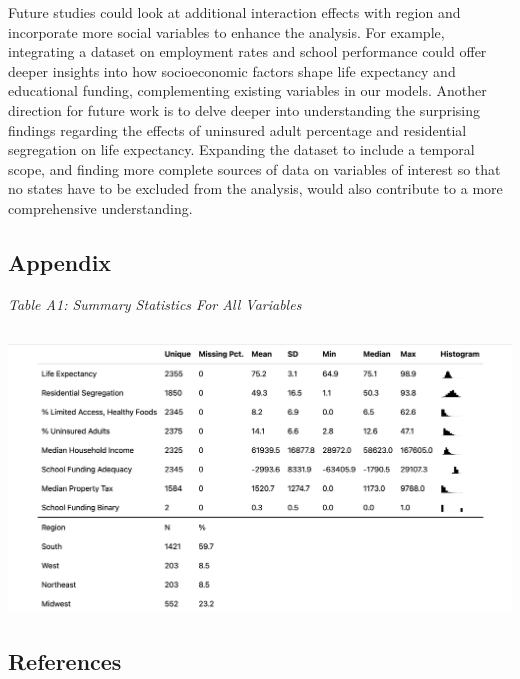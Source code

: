 \documentclass[
  10pt,
  letterpaper,
  DIV=11,
  numbers=noendperiod]{scrartcl}
\begin{document}
Future studies could look at additional interaction effects with region
and incorporate more social variables to enhance the analysis. For
example, integrating a dataset on employment rates and school
performance could offer deeper insights into how socioeconomic factors
shape life expectancy and educational funding, complementing existing
variables in our models. Another direction for future work is to delve
deeper into understanding the surprising findings regarding the effects
of uninsured adult percentage and residential segregation on life
expectancy. Expanding the dataset to include a temporal scope, and
finding more complete sources of data on variables of interest so that
no states have to be excluded from the analysis, would also contribute
to a more comprehensive understanding.

\subsection{\texorpdfstring{\textbf{Appendix}}{Appendix}}\label{appendix}

\emph{Table A1: Summary Statistics For All Variables}

\subsection{\texorpdfstring{\protect\includegraphics{images/clipboard-2912764107.png}}{}}\label{section}

\subsection{\texorpdfstring{\textbf{References}}{References}}\label{references}
\end{document}

